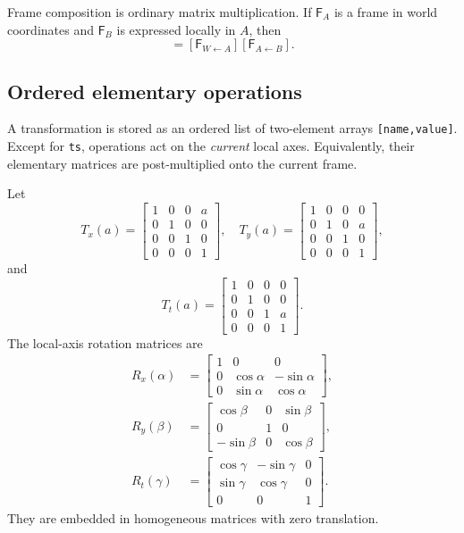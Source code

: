 \documentclass[11pt,a4paper]{article}
\newcommand{\Frame}{\mathsf{F}}
\begin{document}
Frame composition is ordinary matrix multiplication.  If $\Frame_A$ is a
frame in world coordinates and $\Frame_B$ is expressed locally in $A$, then
\begin{equation}
  [\Frame_{W\leftarrow B}]
  = [\Frame_{W\leftarrow A}][\Frame_{A\leftarrow B}].
  \label{eq:composition}
\end{equation}

\subsection{Ordered elementary operations}

A transformation is stored as an ordered list of two-element arrays
\texttt{[name,value]}.  Except for \texttt{ts}, operations act on the
\emph{current} local axes.  Equivalently, their elementary matrices are
post-multiplied onto the current frame.

Let
\begin{equation}
  T_x(a)=
  \begin{bmatrix}1&0&0&a\\0&1&0&0\\0&0&1&0\\0&0&0&1\end{bmatrix},\quad
  T_y(a)=
  \begin{bmatrix}1&0&0&0\\0&1&0&a\\0&0&1&0\\0&0&0&1\end{bmatrix},
\end{equation}
and
\begin{equation}
  T_t(a)=
  \begin{bmatrix}1&0&0&0\\0&1&0&0\\0&0&1&a\\0&0&0&1\end{bmatrix}.
\end{equation}
The local-axis rotation matrices are
\begin{align}
  R_x(\alpha)&=
  \begin{bmatrix}
    1&0&0\\0&\cos\alpha&-\sin\alpha\\0&\sin\alpha&\cos\alpha
  \end{bmatrix},\\
  R_y(\beta)&=
  \begin{bmatrix}
    \cos\beta&0&\sin\beta\\0&1&0\\-\sin\beta&0&\cos\beta
  \end{bmatrix},\\
  R_t(\gamma)&=
  \begin{bmatrix}
    \cos\gamma&-\sin\gamma&0\\\sin\gamma&\cos\gamma&0\\0&0&1
  \end{bmatrix}.
\end{align}
They are embedded in homogeneous matrices with zero translation.
\end{document}
